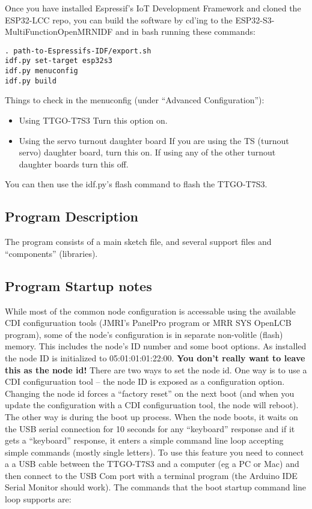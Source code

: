 Once you have installed Espressif's IoT Development Framework and cloned the 
ESP32-LCC repo, you can build the software by cd'ing to the 
ESP32-S3-MultiFunctionOpenMRNIDF and in bash running these commands:

\begin{verbatim}
. path-to-Espressifs-IDF/export.sh
idf.py set-target esp32s3
idf.py menuconfig
idf.py build
\end{verbatim}

Things to check in the menuconfig (under ``Advanced Configuration''):

\begin{itemize}
\item{Using TTGO-T7S3} Turn this option on.
\item{Using the servo turnout daughter board} If you are using the TS (turnout 
servo) daughter board, turn this on.  If using any of the other turnout 
daughter boards turn this off.
\end{itemize}

You can then use the idf.py's flash command to flash the TTGO-T7S3.

\subsection{Program Description}

The program consists of a main sketch file, and several support files and
``components'' (libraries).

\subsection{Program Startup notes}

While most of the common node configuration is accessable using the available
CDI configuruation tools (JMRI's PanelPro program or MRR SYS OpenLCB program),
some of the node's configuration is in separate non-volitle (flash) memory.
This includes the node's ID number and some boot options. As installed the
node ID is initialized to 05:01:01:01:22:00. \textbf{You don't really want to
leave this as the node id!} There are two ways to set the node id. One way is
to use a CDI configuruation tool -- the node ID is exposed as a configuration
option. Changing the node id forces a ``factory reset'' on the next boot (and
when you update the configuration with a CDI configuruation tool, the node
will reboot). The other way is during the boot up process. When the node
boots, it waits on the USB serial connection for 10 seconds for any
``keyboard'' response and if it gets a ``keyboard'' response, it enters a
simple command line loop accepting simple commands (mostly single letters). To
use this feature you need to connect a a USB cable between the TTGO-T7S3 and a
computer (eg a PC or Mac) and then connect to the USB Com port with a terminal
program (the Arduino IDE Serial Monitor should work). The commands that the
boot startup command line loop supports are:

